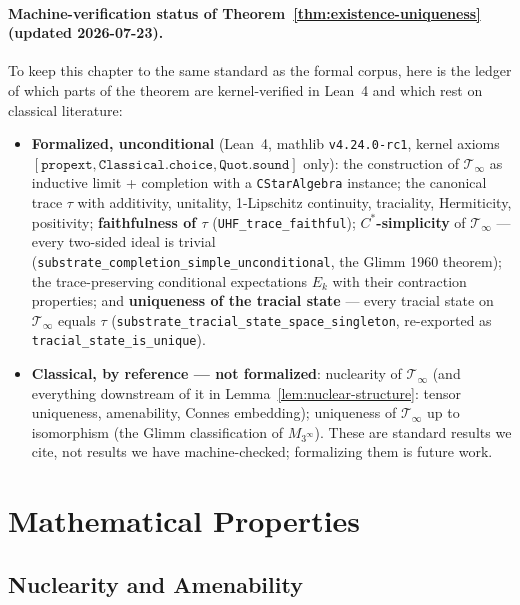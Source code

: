 \begin{level3}
\paragraph{Machine-verification status of Theorem~\ref{thm:existence-uniqueness} (updated 2026-07-23).}
To keep this chapter to the same standard as the formal corpus, here is the ledger of which parts of the theorem are kernel-verified in Lean~4 and which rest on classical literature:
\begin{itemize}
\item \textbf{Formalized, unconditional} (Lean~4, mathlib \texttt{v4.24.0-rc1}, kernel axioms $[\texttt{propext}, \texttt{Classical.choice}, \texttt{Quot.sound}]$ only): the construction of $\mathcal{T}_\infty$ as inductive limit + completion with a \texttt{CStarAlgebra} instance; the canonical trace $\tau$ with additivity, unitality, 1-Lipschitz continuity, traciality, Hermiticity, positivity; \textbf{faithfulness of $\tau$} (\texttt{UHF\_trace\_faithful}); \textbf{$C^*$-simplicity} of $\mathcal{T}_\infty$ --- every two-sided ideal is trivial (\texttt{substrate\_completion\_simple\_unconditional}, the Glimm 1960 theorem); the trace-preserving conditional expectations $E_k$ with their contraction properties; and \textbf{uniqueness of the tracial state} --- every tracial state on $\mathcal{T}_\infty$ equals $\tau$ (\texttt{substrate\_tracial\_state\_space\_singleton}, re-exported as \texttt{tracial\_state\_is\_unique}).
\item \textbf{Classical, by reference --- not formalized}: nuclearity of $\mathcal{T}_\infty$ (and everything downstream of it in Lemma~\ref{lem:nuclear-structure}: tensor uniqueness, amenability, Connes embedding); uniqueness of $\mathcal{T}_\infty$ up to isomorphism (the Glimm classification of $M_{3^\infty}$). These are standard results we cite, not results we have machine-checked; formalizing them is future work.
\end{itemize}
\end{level3}

\section{Mathematical Properties}
\label{sec:math-properties}

\subsection{Nuclearity and Amenability}


